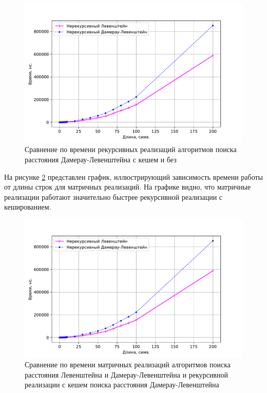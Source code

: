 \begin{figure}[h]
	\centering
	\includegraphics[height=0.5\textheight, page=2]{img/figures.pdf}
	\caption{Сравнение по времени рекурсивных реализаций алгоритмов поиска расстояния Дамерау-Левенштейна с кешем и без}
	\label{plt:time_02}
\end{figure}

На рисунке \ref{plt:time_03} представлен график, иллюстрирующий зависимость времени работы от длины строк для матричных реализаций. На графике видно, что матричные реализации работают значительно быстрее рекурсивной реализации с кешированием. 

\begin{figure}[h]
	\centering
	\includegraphics[height=0.5\textheight, page=3]{img/figures.pdf}
	\caption{Сравнение по времени матричных реализаций алгоритмов поиска расстояния Левенштейна и Дамерау-Левенштейна и рекурсивной реализации с кешем поиска расстояния Дамерау-Левенштейна}
	\label{plt:time_03}
\end{figure}


